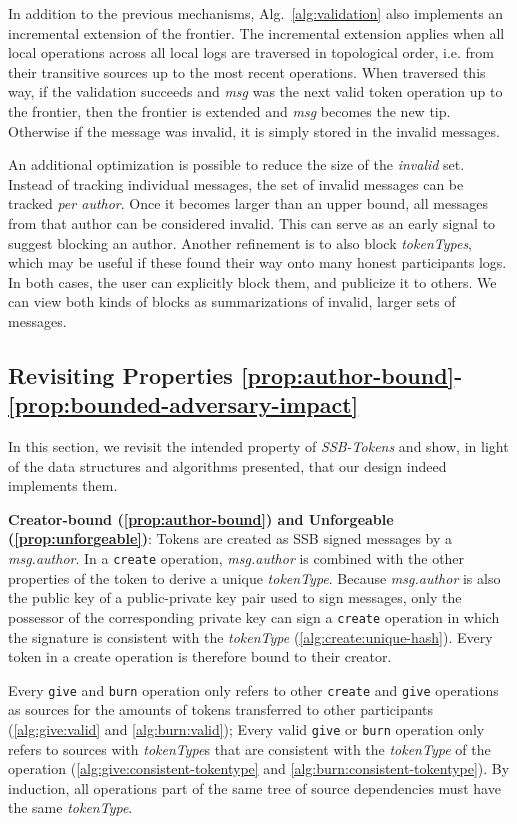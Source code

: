 \documentclass[sigplan,screen,10pt]{acmart}
\newcommand\ssbtokens[0]{\textit{SSB-Tokens} }
\begin{document}
In addition to the previous mechanisms, Alg.~\ref{alg:validation} also implements an incremental extension of the frontier. The incremental extension applies when all local operations across all local logs are traversed in topological order, i.e. from their transitive sources up to the most recent operations. When traversed this way, if the validation succeeds and \textit{msg} was the next valid token operation up to the frontier, then the frontier is extended and  \textit{msg} becomes the new tip. Otherwise if the message was invalid, it is simply stored in the invalid messages.

An additional optimization is possible to reduce the size of the \textit{invalid} set. Instead of tracking individual messages, the set of invalid messages can be tracked \textit{per author}. Once it becomes larger than an upper bound, all messages from that author can be considered invalid. This can serve as an early signal to suggest blocking an author. Another refinement is to also block \textit{tokenTypes}, which may be useful if these found their way onto many honest participants logs. In both cases, the user can explicitly block them, and publicize it to others. We can view both kinds of blocks as summarizations of invalid, larger sets of messages.

\subsection{Revisiting Properties  \ref{prop:author-bound}-\ref{prop:bounded-adversary-impact}}
\label{section:properties}
In this section, we revisit the intended property of \ssbtokens and show, in light of the data structures and algorithms presented, that our design indeed implements them.

\textbf{Creator-bound (\ref{prop:author-bound}) and Unforgeable (\ref{prop:unforgeable})}: Tokens are created as SSB signed messages by a \textit{msg.author}. In a \texttt{create} operation, \textit{msg.author} is combined with the other properties of the token to derive a unique \textit{tokenType}. Because \textit{msg.author} is also the public key of a public-private key pair used to sign messages, only the possessor of the corresponding private key can sign a \texttt{create} operation in which the signature is consistent with the \textit{tokenType} (\ref{alg:create:unique-hash}).  Every token in a create operation is therefore bound to their creator. 

Every \texttt{give} and \texttt{burn} operation only refers to other \texttt{create} and \texttt{give} operations as sources  for the amounts of tokens transferred to other participants (\ref{alg:give:valid} and \ref{alg:burn:valid}); Every valid \texttt{give} or \texttt{burn} operation only refers to sources with \textit{tokenType}s that are consistent with the \textit{tokenType} of the operation (\ref{alg:give:consistent-tokentype} and \ref{alg:burn:consistent-tokentype}). By induction, all operations part of the same tree of source dependencies must have the same \textit{tokenType}. 
\end{document}
